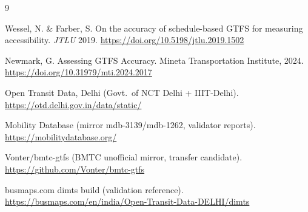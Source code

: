 \documentclass[11pt,a4paper]{article}
\begin{document}
\begin{thebibliography}{9}

 Wessel, N. \& Farber, S. On the accuracy of schedule-based GTFS for measuring accessibility. \textit{JTLU} 2019. \url{https://doi.org/10.5198/jtlu.2019.1502}

 Newmark, G. Assessing GTFS Accuracy. Mineta Transportation Institute, 2024. \url{https://doi.org/10.31979/mti.2024.2017}

 Open Transit Data, Delhi (Govt.\ of NCT Delhi + IIIT-Delhi). \url{https://otd.delhi.gov.in/data/static/}

 Mobility Database (mirror mdb-3139/mdb-1262, validator reports). \url{https://mobilitydatabase.org/}

 Vonter/bmtc-gtfs (BMTC unofficial mirror, transfer candidate). \url{https://github.com/Vonter/bmtc-gtfs}

 busmaps.com dimts build (validation reference). \url{https://busmaps.com/en/india/Open-Transit-Data-DELHI/dimts}

\end{thebibliography}
\end{document}
